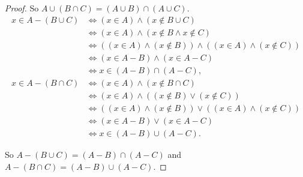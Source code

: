 \begin{proof}
    So $A\cup (B\cap C) = (A\cup B)\cap (A\cup C)$.
    \begin{align*}
        x\in A - (B\cup C) & \Longleftrightarrow (x\in A)\land (x\notin B\cup C)                               \\
                           & \Longleftrightarrow (x\in A)\land (x\notin B \land x\notin C)                     \\
                           & \Longleftrightarrow ((x\in A)\land (x\notin B)) \land ((x\in A)\land (x\notin C)) \\
                           & \Longleftrightarrow (x\in A - B)\land (x\in A - C)                                \\
                           & \Longleftrightarrow x\in (A - B)\cap (A - C),                                     \\
        x\in A - (B\cap C) & \Longleftrightarrow (x\in A)\land (x\notin B\cap C)                               \\
                           & \Longleftrightarrow (x\in A)\land ((x\notin B)\lor (x\notin C))                   \\
                           & \Longleftrightarrow ((x\in A)\land (x\notin B))\lor ((x\in A)\land (x\notin C))   \\
                           & \Longleftrightarrow (x\in A - B)\lor (x\in A - C)                                 \\
                           & \Longleftrightarrow x\in (A - B)\cup (A - C).
    \end{align*}

    So $A - (B\cup C) = (A - B)\cap (A - C)$ and $A - (B\cap C) = (A - B)\cup (A - C)$.
\end{proof}

